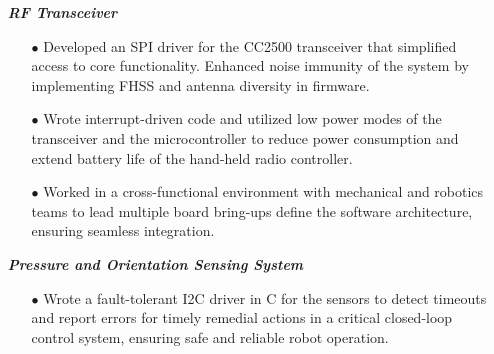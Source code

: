 \documentclass[11pt]{article}
\begin{document}
\begin{itemize}[leftmargin=0.01in]\setlength\itemsep{-3pt}
  \item[]  \textbf{\emph{RF Transceiver}}
    \begin{itemize}\setlength{\itemsep}{0pt}\setlength{\parskip}{0pt}\vspace{-0.1em}
      \item[$\bullet$] Developed an SPI driver for the CC2500 transceiver that simplified access to core functionality. Enhanced noise immunity of the system by implementing FHSS and antenna diversity in firmware.
       \item[$\bullet$] Wrote interrupt-driven code and utilized low power modes of the transceiver and the microcontroller to reduce power consumption and extend battery life of the hand-held radio controller.
      \item[$\bullet$] Worked in a cross-functional environment with mechanical and robotics teams to lead multiple board bring-ups define the software architecture, ensuring seamless integration.
    \end{itemize}
  \item[]  \textbf{\emph{Pressure and Orientation Sensing System}}
    \begin{itemize}\setlength{\itemsep}{0pt}\setlength{\parskip}{0pt}\vspace{-0.1em}
      \item[$\bullet$] Wrote a fault-tolerant I2C driver in C for the sensors to detect timeouts and report errors for timely remedial actions in a critical closed-loop control system, ensuring safe and reliable robot operation.
   \end{itemize}



\end{itemize}
\end{document}
